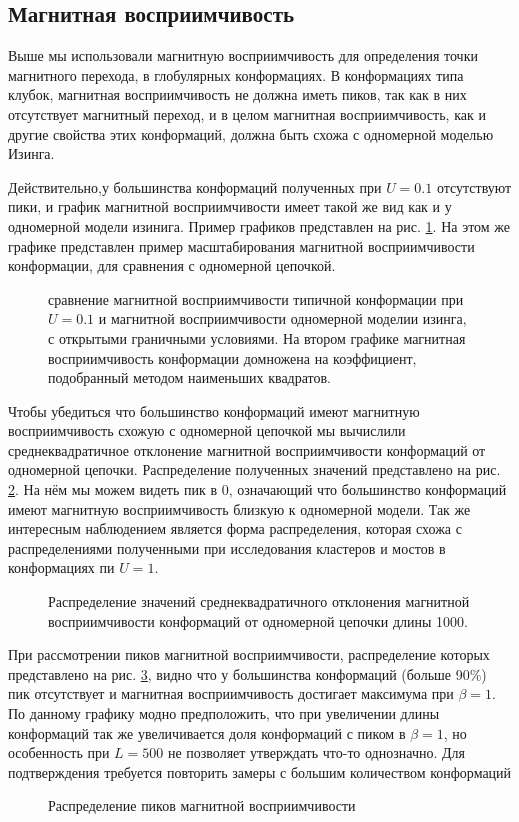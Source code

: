 \subsection{Магнитная восприимчивость}
Выше мы использовали магнитную восприимчивость для определения точки магнитного перехода, в глобулярных конформациях. В конформациях типа клубок, магнитная восприимчивость не должна иметь пиков, так как в них отсутствует магнитный переход, и в целом магнитная восприимчивость, как и другие свойства этих конформаций, должна быть схожа с одномерной моделью Изинга.

Действительно,у большинства конформаций полученных при $U=0.1$ отсутствуют пики, и график магнитной восприимчивости имеет такой же вид как и у одномерной модели изинига. Пример графиков представлен на рис. \ref{fig:MS_1D_comparison}. На этом же графике представлен пример масштабирования магнитной восприимчивости конформации, для сравнения с одномерной цепочкой.

\begin{figure}[ht]
	\centering
	
	\caption{сравнение магнитной восприимчивости типичной конформации при $U=0.1$ и магнитной восприимчивости одномерной моделии изинга, с открытыми граничными условиями. На втором графике магнитная восприимчивость конформации домножена на коэффициент, подобранный методом наименьших квадратов.}
	\label{fig:MS_1D_comparison}
\end{figure}


Чтобы убедиться что большинство конформаций имеют магнитную восприимчивость схожую с одномерной цепочкой мы вычислили среднеквадратичное отклонение магнитной восприимчивости конформаций от одномерной цепочки. Распределение полученных значений представлено на рис. \ref{fig:MS_1D_dif_distr}. На нём мы можем видеть пик в 0, означающий что большинство конформаций имеют магнитную восприимчивость близкую к одномерной модели. Так же интересным наблюдением является форма распределения, которая схожа с распределениями полученными при исследования кластеров и мостов в конформациях пи $U=1$.

\begin{figure}[ht]
	\centering
	
	\caption{Распределение значений среднеквадратичного отклонения магнитной восприимчивости конформаций от одномерной цепочки длины 1000.}
	\label{fig:MS_1D_dif_distr}
\end{figure}

При рассмотрении пиков магнитной восприимчивости, распределение которых представлено на рис. \ref{fig:MS_peaks_distr}, видно что у большинства конформаций (больше 90\%) пик отсутствует и магнитная восприимчивость достигает максимума при $\beta = 1$. По данному графику модно предположить, что при увеличении длины конформаций так же увеличивается доля конформаций с пиком в $\beta = 1$, но особенность при $L=500$ не позволяет утверждать что-то однозначно. Для подтверждения требуется повторить замеры с большим количеством конформаций


\begin{figure}[ht]
	\centering
	
	\caption{Распределение пиков магнитной восприимчивости}
	\label{fig:MS_peaks_distr}
\end{figure}
